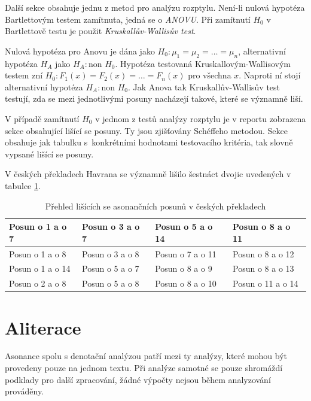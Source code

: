 \documentclass[dp.tex]{subfiles}
\begin{document}
Další sekce obsahuje jednu z metod pro analýzu rozptylu. Není-li nulová hypotéza Bartlettovým testem zamítnuta, jedná se o \textit{ANOVU}. Při zamítnutí $H_0$ v Bartlettově testu je použit \textit{Kruskallův-Wallisův test}.

Nulová hypotéza pro Anovu je dána jako $H_0: \mu_1 = \mu_2 = \dots = \mu_n$, alternativní hypotéza $H_A$ jako $H_A:  \mbox{non } H_0$. Hypotéza testovaná Kruskallovým-Wallisovým testem zní $H_0: F_1(x) = F_2(x) = \dots = F_n(x)$ pro všechna $x$. Naproti ní stojí alternativní hypotéza $H_A: \mbox{non } H_0$. Jak Anova tak Kruskallův-Wallisův test testují, zda se mezi jednotlivými posuny nacházejí takové, které se významně liší.

V případě zamítnutí $H_0$ v jednom z testů analýzy rozptylu je v reportu zobrazena sekce obsahující lišící se posuny. Ty jsou zjišťovány Schéffeho metodou. Sekce obsahuje jak tabulku s~konkrétními hodnotami testovacího kritéria, tak slovně vypsané lišící se posuny.

V českých překladech Havrana se významně lišilo šestnáct dvojic uvedených v tabulce \ref{tab:asonance-lisici-se}.
\begin {table}[H]
	\caption {Přehled lišících se asonančních posunů v českých překladech} 
	\label{tab:asonance-lisici-se} 

	\begin{center}
		\begin{tabular}{|l|l|l|l|}
		\hline Posun o 1 a o 7   & Posun o 3 a o 7 & Posun o 5 a o 14 & Posun o 8 a o 11  \\ 
		\hline Posun o 1 a o 8   & Posun o 3 a o 8 & Posun o 7 a o 11 & Posun o 8 a o 12  \\ 
		\hline Posun o 1 a o 14  & Posun o 5 a o 7 & Posun o 8 a o 9  & Posun o 8 a o 13  \\ 
		\hline Posun o 2 a o 8   & Posun o 5 a o 8 & Posun o 8 a o 10 & Posun o 11 a o 14 \\ 
		\hline 
		\end{tabular} 
	\end{center}
\end{table}

\section{Aliterace}

Asonance spolu s denotační analýzou patří mezi ty analýzy, které mohou být provedeny pouze na jednom textu. Při analýze samotné se pouze shromáždí podklady pro další zpracování, žádné výpočty nejsou během analyzování prováděny.
\end{document}
